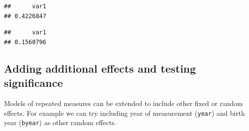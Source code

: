 \documentclass[
  12pt,
]{book}
\newenvironment{Shaded}{\begin{snugshade}}{\end{snugshade}}
\newcommand{\FloatTok}[1]{\textcolor[rgb]{0.00,0.00,0.81}{#1}}
\newcommand{\KeywordTok}[1]{\textcolor[rgb]{0.13,0.29,0.53}{\textbf{#1}}}
\newcommand{\NormalTok}[1]{#1}
\newcommand{\OperatorTok}[1]{\textcolor[rgb]{0.81,0.36,0.00}{\textbf{#1}}}
\newcommand{\StringTok}[1]{\textcolor[rgb]{0.31,0.60,0.02}{#1}}
\begin{document}
\begin{Shaded}
\end{Shaded}

\begin{verbatim}
##      var1 
## 0.4226847
\end{verbatim}

\begin{Shaded}
\end{Shaded}

\begin{verbatim}
##      var1 
## 0.1560796
\end{verbatim}

\hypertarget{adding-additional-effects-and-testing-significance-1}{%
\subsection{Adding additional effects and testing significance}\label{adding-additional-effects-and-testing-significance-1}}

Models of repeated measures can be extended to include other fixed or random effects.
For example we can try including year of measurement (\texttt{year}) and birth year (\texttt{byear}) as other random effects.
\end{document}
